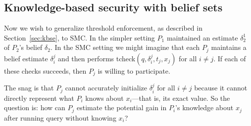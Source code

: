\documentclass[10pt]{sigplanconf}
\newcommand{\polc}{\textsf{tcheck}}
\begin{document}


\subsection{Knowledge-based security with belief sets}
\label{sec:belief-set}




Now we wish to generalize threshold enforcement, as described
in Section~\ref{sec:kbse}, to SMC\@.  In the simpler setting $P_1$ maintained an
estimate $\delta_2^1$ of $P_2$'s belief $\delta_2$.  In the SMC setting
we might imagine that each $P_j$ maintains a belief estimate
$\delta_i^j$ and then performs \polc$(q,\delta_i^j,t_j,x_j)$ for all
$i \not= j$.  If each of these checks succeeds, then $P_j$ is willing
to participate.

The snag is that $P_j$ cannot accurately initialize $\delta^j_i$ for
all $i \not= j$ because it cannot directly represent what $P_i$ knows
about $x_i$---that is, its exact value.  So
the question is: how can $P_j$ estimate the potential gain in $P_i$'s
knowledge about $x_j$ after running query without knowing $x_i$?
\end{document}
